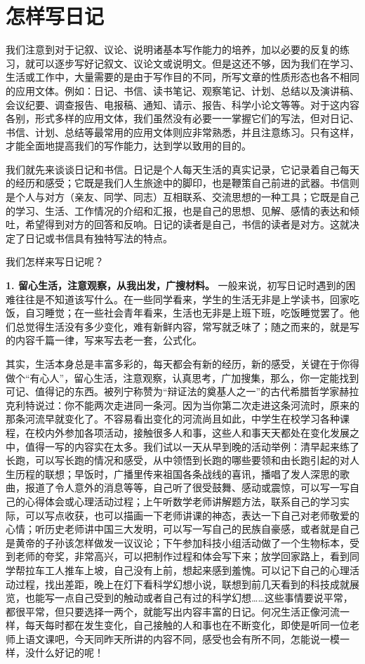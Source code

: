 \section{怎样写日记}

我们注意到对于记叙、议论、说明诸基本写作能力的培养，加以必要的反复的练习，就可以逐步写好记叙文、议论文或说明文。但是这还不够，因为我们在学习、生活或工作中，大量需要的是由于写作目的不同，所写文章的性质形态也各不相同的应用文体。例如：日记、书信、读书笔记、观察笔记、计划、总结以及演讲稿、会议纪要、调查报告、电报稿、通知、请示、报告、科学小论文等等。对于这内容各别，形式多样的应用文体，我们虽然没有必要一一掌握它们的写法，但对日记、书信、计划、总结等最常用的应用文体则应非常熟悉，并且注意练习。只有这样，才能全面地提高我们的写作能力，达到学以致用的目的。

我们就先来谈谈日记和书信。日记是个人每天生活的真实记录，它记录着自己每天的经历和感受；它既是我们人生旅途中的脚印，也是鞭策自己前进的武器。书信则是个人与对方（亲友、同学、同志）互相联系、交流思想的一种工具；它既是自己的学习、生活、工作情况的介绍和汇报，也是自己的思想、见解、感情的表达和倾吐，希望得到对方的回答和反响。日记的读者是自己，书信的读者是对方。这就决定了日记或书信具有独特写法的特点。

我们怎样来写日记呢？

\textbf{1. 留心生活，注意观察，从我出发，广搜材料。}
一般来说，初写日记时遇到的困难往往是不知道该写什么。在一些同学看来，学生的生活无非是上学读书，回家吃饭，自习睡觉；在一些社会青年看来，生活也无非是上班下班，吃饭睡觉罢了。他们总觉得生活没有多少变化，难有新鲜内容，常写就乏味了；随之而来的，就是写的内容千篇一律，写来写去老一套，公式化。

其实，生活本身总是丰富多彩的，每天都会有新的经历，新的感受，关键在于你得做个“有心人”，留心生活，注意观察，认真思考，广加搜集，那么，你一定能找到可记、值得记的东西。被列宁称赞为“辩证法的奠基人之一”的古代希腊哲学家赫拉克利特说过：你不能两次走进同一条河。因为当你第二次走进这条河流时，原来的那条河流早就变化了。不容易看出变化的河流尚且如此，中学生在校学习各种课程，在校内外参加各项活动，接触很多人和事，这些人和事天天都处在变化发展之中，值得一写的内容实在太多。我们试以一天从早到晚的活动举例：清早起来练了长跑，可以写长跑的情况和感受，从中领悟到长跑的哪些要领和由长跑引起的对人生历程的联想；早饭时，广播里传来祖国各条战线的喜讯，播唱了发人深思的歌曲，报道了令人意外的消息等等，自己听了很受鼓舞、感动或震惊，可以写一写自己的心得体会或心理活动过程；上午听数学老师讲解题方法，联系自己的学习实际，可以写点收获，也可以描画一下老师讲课的神态，表达一下自己对老师敬爱的心情；听历史老师讲中国三大发明，可以写一写自己的民族自豪感，或者就是自己是黄帝的子孙该怎样做发一议议论；下午参加科技小组活动做了一个生物标本，受到老师的夸奖，非常高兴，可以把制作过程和体会写下来；放学回家路上，看到同学帮拉车工人推车上坡，自己没有上前，想起来感到羞愧。可以记下自己的心理活动过程，找出差距，晚上在灯下看科学幻想小说，联想到前几天看到的科技成就展览，也能写一点自己受到的触动或者自己有过的科学幻想……这些事情要说平常，都很平常，但只要选择一两个，就能写出内容丰富的日记。何况生活正像河流一样，每天每时都在发生变化，自己接触的人和事也在不断变化，即使是听同一位老师上语文课吧，今天同昨天所讲的内容不同，感受也会有所不同，怎能说一模一样，没什么好记的呢！

